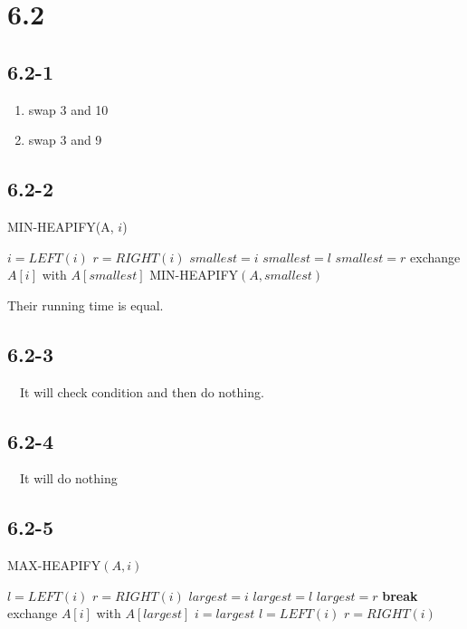 \documentclass{article}
\begin{document}
\section*{6.2}

\subsection*{6.2-1}
\begin{enumerate}
\item swap 3 and 10
\item swap 3 and 9
\end{enumerate}

\subsection*{6.2-2}
\begin{algorithm}
\caption{MIN-HEAPIFY(A, $i$)}
\begin{algorithmic}[1]
\STATE $i = LEFT(i)$
\STATE $r = RIGHT(i)$
\STATE $smallest = i$
\ELSE
\STATE $smallest = l$
\ENDIF
{}
\STATE $smallest = r$
\ENDIF
{}
\STATE exchange $A[i]$ with $A[smallest]$
\STATE MIN-HEAPIFY$(A, smallest)$
\ENDIF
\end{algorithmic}
\end{algorithm}
Their running time is equal.

\subsection*{6.2-3}
~~It will check condition and then do nothing.


\subsection*{6.2-4}
~~It will do nothing

\subsection*{6.2-5}
\begin{algorithm}
\caption{MAX-HEAPIFY$(A, i)$}
\begin{algorithmic}[1]
\STATE $l = LEFT(i)$
\STATE $r = RIGHT(i)$
\STATE $largest = i$
\STATE $largest = l$
\ENDIF
{}
\STATE $largest = r$
\ENDIF
{}
\STATE \textbf{break}
\ELSE
\STATE exchange $A[i]$ with $A[largest]$
\STATE $i = largest$
\STATE $l = LEFT(i)$
\STATE $r = RIGHT(i)$
\ENDIF
\ENDWHILE
\end{algorithmic}
\end{algorithm}
\end{document}
